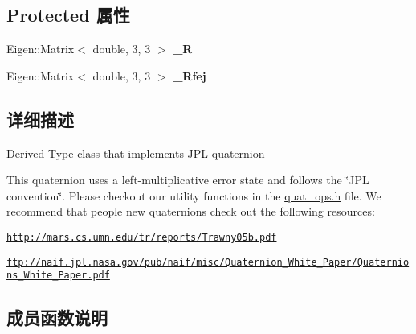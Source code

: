 \subsection*{Protected 属性}
\begin{DoxyCompactItemize}
\item 
\mbox{\label{classov__type_1_1JPLQuat_a96c5f21fbff5ba2ecd0e9daf05a24765}} 
Eigen\+::\+Matrix$<$ double, 3, 3 $>$ {\bfseries \+\_\+R}
\item 
\mbox{\label{classov__type_1_1JPLQuat_aa87a66b60ae150c0006fed0559787644}} 
Eigen\+::\+Matrix$<$ double, 3, 3 $>$ {\bfseries \+\_\+\+Rfej}
\end{DoxyCompactItemize}


\subsection{详细描述}
Derived \hyperlink{classov__type_1_1Type}{Type} class that implements J\+PL quaternion 

This quaternion uses a left-\/multiplicative error state and follows the \char`\"{}\+J\+P\+L convention\char`\"{}. Please checkout our utility functions in the \hyperlink{quat__ops_8h_source}{quat\+\_\+ops.\+h} file. We recommend that people new quaternions check out the following resources\+:
\begin{DoxyItemize}
\item \href{http://mars.cs.umn.edu/tr/reports/Trawny05b.pdf}{\tt http\+://mars.\+cs.\+umn.\+edu/tr/reports/\+Trawny05b.\+pdf}
\item \href{ftp://naif.jpl.nasa.gov/pub/naif/misc/Quaternion_White_Paper/Quaternions_White_Paper.pdf}{\tt ftp\+://naif.\+jpl.\+nasa.\+gov/pub/naif/misc/\+Quaternion\+\_\+\+White\+\_\+\+Paper/\+Quaternions\+\_\+\+White\+\_\+\+Paper.\+pdf} 
\end{DoxyItemize}

\subsection{成员函数说明}
\mbox{\label{classov__type_1_1JPLQuat_ae631d6cf4ed4170234272be498fd22e3}} 
